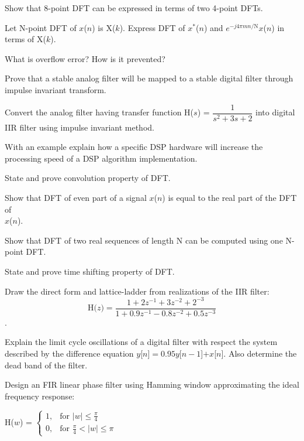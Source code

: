\item Show that 8-point DFT can be expressed in terms of two 4-point DFTs.
\item Let N-point DFT of $x$($n$) is X($k$). Express DFT of $x^*$($n$) and $e^{-j4\pi mn/\text{N}}x$($n$) in
  terms of X($k$).
\item What is overflow error? How is it prevented?
\item Prove that a stable analog filter will be mapped to a stable digital
  filter through impulse invariant transform.
\item Convert the analog filter having transfer function H($s$) = $\dfrac{1}{s^2 + 3s + 2}$ into digital
  IIR filter using impulse invariant method.
\item With an example explain how a specific DSP hardware will increase the processing speed of a 
  DSP algorithm implementation.

\markB
\partCo

\item \iitem \iitem State and prove convolution property of DFT. 
\item Show that DFT of even part of a signal $x$($n$) is equal to the real part of
  the DFT of \\ $x$($n$). 
\ene 

\newpage \again

\Or
\item \iitem Show that DFT of two real sequences of length N can be computed using one
  N-point DFT. 
\item State and prove time shifting property of DFT. 
\ene \ene

\item \iitem Draw the direct form and lattice-ladder from realizations of the IIR filter:
\[ \text{H(}z\text{)} = \dfrac{1 + 2z^{-1} + 3z^{-2} + 2^{-3}}{1 + 0.9z^{-1} - 0.8z^{-2} + 0.5z^{-3}}\].
\Or
\item Explain the limit cycle oscillations of a digital filter with respect the system described by the
  difference equation $y$[$n$]$ = 0.95y$[$n - 1$]$ + x$[$n$]. Also determine the dead band of the filter.
\ene
\item \iitem Design an FIR linear phase filter using Hamming window approximating the ideal frequency
  response:

\hspace{0.5cm} H($w$) = $\begin{cases}
  1, & \text{for }|w| \leq \frac{\pi}{4}\\
  0, & \text{for } \frac{\pi}{4} < |w| \leq \pi
\end{cases}$

